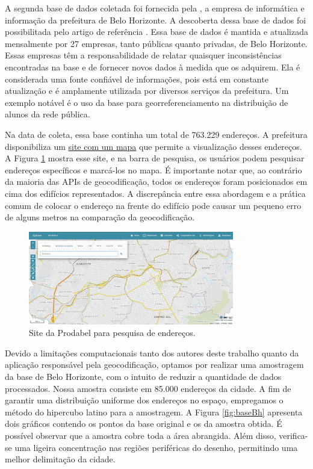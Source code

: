 A segunda base de dados coletada foi fornecida pela \cite{Prodabel}, a empresa de informática e informação da prefeitura de Belo Horizonte. A descoberta dessa base de dados foi possibilitada pelo artigo de referência \cite{Clodoveu2011}. Essa base de dados é mantida e atualizada mensalmente por 27 empresas, tanto públicas quanto privadas, de Belo Horizonte. Essas empresas têm a responsabilidade de relatar quaisquer inconsistências encontradas na base e de fornecer novos dados à medida que os adquirem. Ela é considerada uma fonte confiável de informações, pois está em constante atualização e é amplamente utilizada por diversos serviços da prefeitura. Um exemplo notável é o uso da base para georreferenciamento na distribuição de alunos da rede pública.

Na data de coleta, essa base continha um total de 763.229 endereços. A prefeitura disponibiliza um \href{https://bhmap.pbh.gov.br}{site com um mapa} que permite a visualização desses endereços. A Figura \ref{fig:siteProdabel} mostra esse site, e na barra de pesquisa, os usuários podem pesquisar endereços específicos e marcá-los no mapa. É importante notar que, ao contrário da maioria das APIs de geocodificação, todos os endereços foram posicionados em cima dos edifícios representados. A discrepância entre essa abordagem e a prática comum de colocar o endereço na frente do edifício pode causar um pequeno erro de alguns metros na comparação da geocodificação.

\begin{figure}
    \centering
    \includegraphics[width=0.8\textwidth]{Figuras/siteProdabel.jpeg}
    \caption{Site da Prodabel para pesquisa de endereços. }
    \label{fig:siteProdabel}
\end{figure}

Devido a limitações computacionais tanto dos autores deste trabalho quanto da aplicação responsável pela geocodificação, optamos por realizar uma amostragem da base de Belo Horizonte, com o intuito de reduzir a quantidade de dados processados. Nossa amostra consiste em 85.000 endereços da cidade. A fim de garantir uma distribuição uniforme dos endereços no espaço, empregamos o método do hipercubo latino para a amostragem. A Figura \ref{fig:baseBh} apresenta dois gráficos contendo os pontos da base original e os da amostra obtida. É possível observar que a amostra cobre toda a área abrangida. Além disso, verifica-se uma ligeira concentração nas regiões periféricas do desenho, permitindo uma melhor delimitação da cidade.

